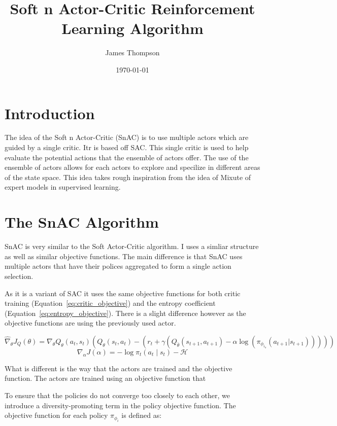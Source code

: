 \documentclass[12pt]{article}
\title{Soft n Actor-Critic Reinforcement Learning Algorithm}
\author{James Thompson}
\date{\today}
\begin{document}
\maketitle

\section{Introduction}
The idea of the Soft n Actor-Critic (SnAC) is to use multiple actors which are guided by a single critic. Itr is based off SAC. This single critic is used to help evaluate the potential actions that the ensemble of actors offer. The use of the ensemble of actors allows for each actors to explore and specilize in different areas of the state space. This idea takes rough inspiration from the idea of Mixute of expert models in supervised learning.

\section{The SnAC Algorithm}

SnAC is very similar to the Soft Actor-Critic algorithm. I uses a simliar structure as well as similar objective functions. The main difference is that SnAC uses multiple actors that have their polices aggregated to form a single action selection.

As it is a variant of SAC it uses the same objective functions for both critic training (Equation~\ref{eq:critic_objective}) and the entropy coefficient (Equation~\ref{eq:entropy_objective}). There is a slight difference however as the objective functions are using the previously used actor.

\begin{equation}
\label{eq:critic_objective}
\hat{\nabla}_{\theta} J_Q(\theta) = \nabla_{\theta} Q_{\theta}(a_t, s_t) \left(Q_{\theta}(s_t, a_t) - \left(r_{t} + \gamma \left(Q_{\bar{\theta}}(s_{t+1}, a_{t+1}) - \alpha \log \left(\pi_{\phi_{i_\pi}}(a_{t+1} | s_{t+1})\right)\right)\right)\right)
\end{equation}
\begin{equation}
\label{eq:entropy_objective}
\nabla_{\alpha} J(\alpha) = -\log \pi_t(a_t \mid s_t) - \mathcal{H}
\end{equation}

What is different is the way that the actors are trained and the objective function. The actors are trained using an objective function that 

To ensure that the policies do not converge too closely to each other, we introduce a diversity-promoting term in the policy objective function. The objective function for each policy $\pi_{\phi_i}$ is defined as:
\end{document}
